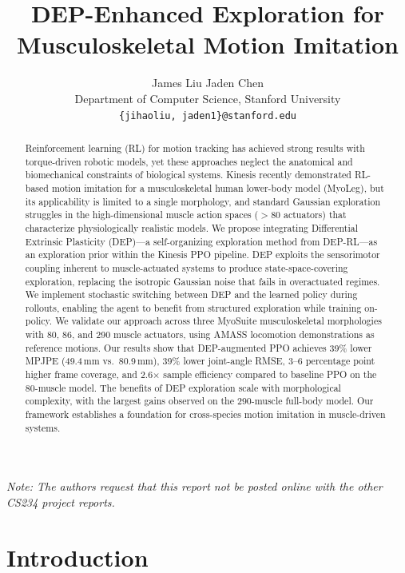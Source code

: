 \documentclass[10pt,twocolumn]{article}
\title{DEP-Enhanced Exploration for\\Musculoskeletal Motion Imitation}
\author{
  James Liu \quad Jaden Chen \\
  Department of Computer Science, Stanford University \\
  \texttt{\{jihaoliu, jaden1\}@stanford.edu}
}
\date{}
\begin{document}
\maketitle

\noindent\textit{Note: The authors request that this report not be posted online with the other CS234 project reports.}

\begin{abstract}
Reinforcement learning (RL) for motion tracking has achieved strong results with torque-driven robotic models, yet these approaches neglect the anatomical and biomechanical constraints of biological systems. Kinesis recently demonstrated RL-based motion imitation for a musculoskeletal human lower-body model (MyoLeg), but its applicability is limited to a single morphology, and standard Gaussian exploration struggles in the high-dimensional muscle action spaces ($>$80 actuators) that characterize physiologically realistic models. We propose integrating Differential Extrinsic Plasticity (DEP)---a self-organizing exploration method from DEP-RL---as an exploration prior within the Kinesis PPO pipeline. DEP exploits the sensorimotor coupling inherent to muscle-actuated systems to produce state-space-covering exploration, replacing the isotropic Gaussian noise that fails in overactuated regimes. We implement stochastic switching between DEP and the learned policy during rollouts, enabling the agent to benefit from structured exploration while training on-policy. We validate our approach across three MyoSuite musculoskeletal morphologies with 80, 86, and 290 muscle actuators, using AMASS locomotion demonstrations as reference motions. Our results show that DEP-augmented PPO achieves 39\% lower MPJPE (49.4\,mm vs.\ 80.9\,mm), 39\% lower joint-angle RMSE, 3--6 percentage point higher frame coverage, and 2.6$\times$ sample efficiency compared to baseline PPO on the 80-muscle model. The benefits of DEP exploration scale with morphological complexity, with the largest gains observed on the 290-muscle full-body model. Our framework establishes a foundation for cross-species motion imitation in muscle-driven systems.
\end{abstract}

\section{Introduction}
\label{sec:intro}
\end{document}
